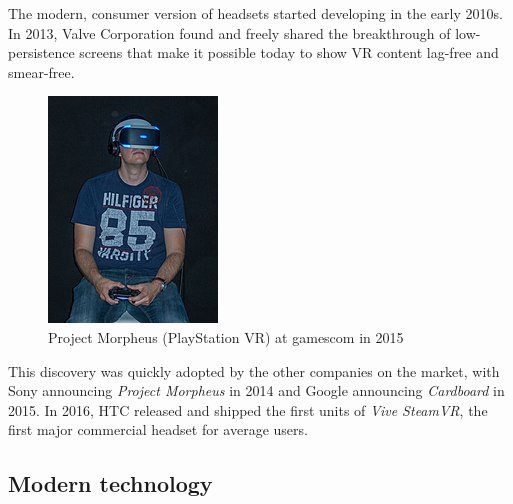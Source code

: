 \documentclass[12pt,a4paper,twoside]{report}
\begin{document}
The modern, consumer version of headsets started developing in the early 2010s. In 2013, Valve Corporation found and freely shared the breakthrough of low-persistence screens that make it possible today to show VR content lag-free and smear-free. 

\begin{figure}
  \includegraphics[width=1.1\linewidth]{img/Sony_morpheus.jpg}
  \caption{Project Morpheus (PlayStation VR) at gamescom in 2015}
  \label{fig:morpheus}
\end{figure}

This discovery was quickly adopted by the other companies on the market, with Sony announcing \textit{Project Morpheus} in 2014 and Google announcing \textit{Cardboard} in 2015. In 2016, HTC released and shipped the first units of \textit{Vive SteamVR}, the first major commercial headset for average users.

\subsection{Modern technology}
\end{document}
